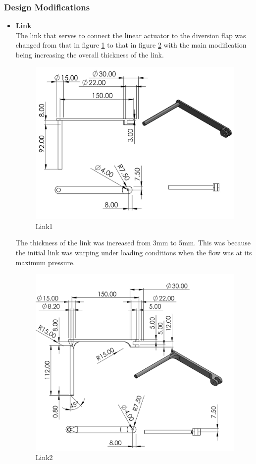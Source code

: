 \subsubsection{Design Modifications}
\begin{itemize}
    \item \textbf{Link}\\
The link that serves to connect the linear actuator to the diversion flap was changed from that in figure \ref{fig: Link 1} to that in figure \ref{fig: Link 2} with the main modification being increasing the overall thickness of the link.
\begin{figure}[H]
\centering
\includegraphics [width=.8\textwidth] {Figures/RockerLink.jpg}
\caption{Link1}
\label{fig: Link 1}
\end{figure}
The thickness of the link was increased from 3mm to 5mm. This was because the initial link was warping under loading conditions when the flow was at its maximum pressure.        
\begin{figure}[H]
\centering
\includegraphics {Figures/RockerLink2.JPG}
\caption{Link2}
\label{fig: Link 2}
\end{figure}
\end{itemize}
